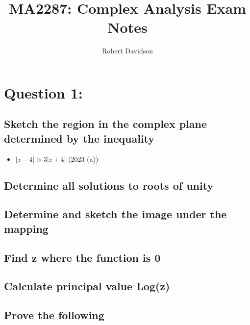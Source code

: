 \documentclass[a4paper, 10pt]{article}
\title{
\textbf{MA2287: Complex Analysis Exam Notes} \\ 
}
\author{
  Robert Davidson
}
\date{} %
\begin{document}
\maketitle
\pagebreak
\tableofcontents
\pagebreak

\section{Question 1: }
\subsection{Sketch the region in the complex plane determined by the inequality}
\begin{itemize}
    \item $|z - 4| > 3|z+4|$ (2023 (a))
\end{itemize}
\subsection{Determine all solutions to roots of unity}
\subsection{Determine and sketch the image under the mapping}
\subsection{Find z where the function is 0}
\subsection{Calculate principal value Log(z)}
\subsection{Prove the following}
\end{document}
